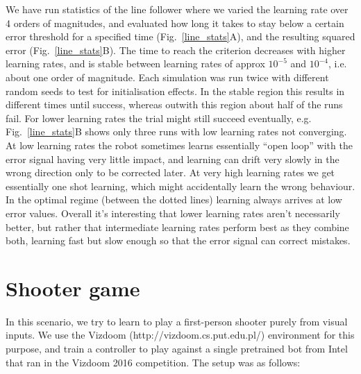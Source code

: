\documentclass{aamas2018}
\begin{document}
We have run statistics of the line follower where we varied the
learning rate over 4 orders of magnitudes, and evaluated how long it
takes to stay below a certain error threshold for a specified time
(Fig.~\ref{line_stats}A), and the resulting squared error
(Fig.~\ref{line_stats}B). The time to reach the criterion decreases
with higher learning rates, and is stable between learning rates of
approx $10^{-5}$ and $10^{-4}$, i.e. about one order of
magnitude. Each simulation was run twice with different random seeds
to test for initialisation effects. In the stable
region this results in different times until success, whereas outwith
this region about half of the runs fail. For lower learning rates the
trial might still succeed eventually, e.g. Fig.~\ref{line_stats}B
shows only three runs with low learning rates not converging. At low
learning rates the robot sometimes learns essentially ``open loop''
with the error signal having very little impact, and learning can
drift very slowly in the wrong direction only to be corrected later.
At very high learning rates we get essentially one shot learning,
which might accidentally learn the wrong behaviour. In the
optimal regime (between the dotted lines) learning always arrives at low
error values. Overall it's interesting that lower learning rates
aren't necessarily better, but rather that intermediate learning
rates perform best as they combine both, learning fast but slow enough
so that the error signal can correct mistakes.





\section{Shooter game}
In this scenario, we try to learn to play a first-person shooter
purely from visual inputs. We use the Vizdoom
(http://vizdoom.cs.put.edu.pl/) environment for this purpose, and
train a controller to play against a single pretrained bot from Intel
that ran in the Vizdoom 2016 competition. The setup was as follows:
\end{document}
